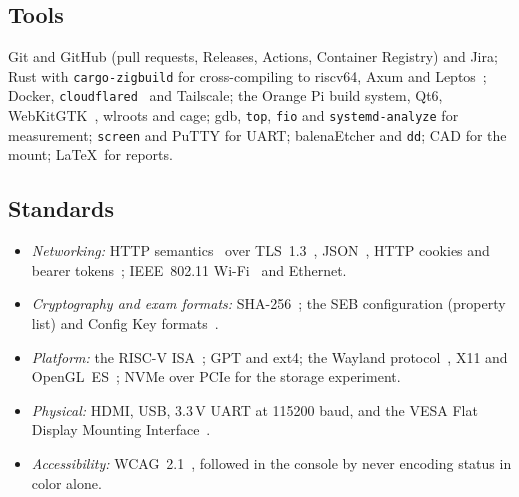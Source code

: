 \documentclass[11pt]{article}
\begin{document}
\subsection{Tools}
Git and GitHub (pull requests, Releases, Actions, Container Registry) and Jira; Rust with \texttt{cargo-zigbuild} for cross-compiling to riscv64, Axum and Leptos~\cite{axum,leptos}; Docker, \texttt{cloudflared}~\cite{cloudflare_tunnel} and Tailscale; the Orange Pi build system, Qt6, WebKitGTK~\cite{webkitgtk}, wlroots and cage; gdb, \texttt{top}, \texttt{fio} and \texttt{systemd-analyze} for measurement; \texttt{screen} and PuTTY for UART; balenaEtcher and \texttt{dd}; CAD for the mount; \LaTeX\ for reports.

\subsection{Standards}
\begin{itemize}
  \item \emph{Networking:} HTTP semantics~\cite{rfc9110} over TLS~1.3~\cite{rfc8446}, JSON~\cite{rfc8259}, HTTP cookies and bearer tokens~\cite{rfc6750}; IEEE~802.11 Wi-Fi~\cite{ieee80211} and Ethernet.
  \item \emph{Cryptography and exam formats:} SHA-256~\cite{fips180}; the SEB configuration (property list) and Config Key formats~\cite{seb_concept}.
  \item \emph{Platform:} the RISC-V ISA~\cite{riscv_priv}; GPT and ext4; the Wayland protocol~\cite{wayland}, X11 and OpenGL~ES~\cite{gles}; NVMe over PCIe for the storage experiment.
  \item \emph{Physical:} HDMI, USB, 3.3\,V UART at 115200 baud, and the VESA Flat Display Mounting Interface~\cite{vesa_fdmi}.
  \item \emph{Accessibility:} WCAG~2.1~\cite{wcag21}, followed in the console by never encoding status in color alone.
\end{itemize}
\end{document}
